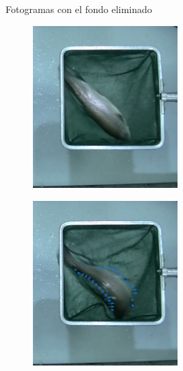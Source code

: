 \begin{enumerate}
\begin{figure}[H]
\begin{subfigure}[b]{\textwidth}
\begin{subfigure}[b]{0.25\textwidth}
                    \label{fig:Vacio4}
                \end{subfigure}
                \caption{Fotogramas con el fondo eliminado}
                \label{fig:FotogramasSilueta}
            \end{subfigure}
            \begin{subfigure}[b]{\textwidth}
                \centering
                \begin{subfigure}[b]{0.25\textwidth}
                    \centering
                    \includegraphics[width=0.8\textwidth]{images/6/SinOptical2.png}
                    \label{fig:Opt2}
                \end{subfigure}
                \begin{subfigure}[b]{0.25\textwidth}
                    \centering
                    \includegraphics[width=0.8\textwidth]{images/6/ConOptical3.png}

\end{subfigure}
\end{subfigure}
\end{figure}
\end{enumerate}

